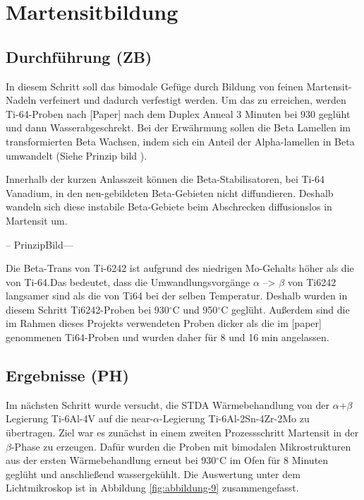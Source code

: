 \chapter{Martensitbildung}

\section{Durchführung (ZB)}

In diesem Schritt soll das bimodale Gefüge durch Bildung von feinen Martensit-Nadeln verfeinert und dadurch verfestigt werden. Um das zu erreichen, werden Ti-64-Proben nach [Paper] nach dem Duplex Anneal 3 Minuten bei 930 geglüht und dann Wasserabgeschrekt. Bei der Erwährmung sollen die Beta Lamellen im transformierten Beta Wachsen, indem sich ein Anteil der Alpha-lamellen in Beta umwandelt (Siehe Prinzip bild ).

Innerhalb der kurzen Anlasszeit können die Beta-Stabilisatoren, bei Ti-64 Vanadium, in den neu-gebildeten Beta-Gebieten nicht diffundieren. Deshalb wandeln sich diese instabile Beta-Gebiete beim Abschrecken diffusionslos in Martensit um.



\vspace{1ex}

-- PrinzipBild---


Die Beta-Trans von Ti-6242 ist aufgrund des niedrigen Mo-Gehalts höher als die von Ti-64.Das bedeutet, dass die Umwandlungsvorgänge $\alpha$ --> $\beta$ von Ti6242 langsamer sind als die von Ti64 bei der selben Temperatur. Deshalb wurden in diesem Schritt Ti6242-Proben bei 930$^\circ$C und 950$^\circ$C  geglüht. Außerdem sind die im Rahmen dieses Projekts verwendeten Proben dicker als die im [paper] genommenen Ti64-Proben und wurden daher für 8 und 16 min angelassen.



\section{Ergebnisse (PH)}

Im nächsten Schritt wurde versucht, die STDA Wärmebehandlung von der $\alpha$+$\beta$ Legierung Ti-6Al-4V auf die near-$\alpha$-Legierung Ti-6Al-2Sn-4Zr-2Mo zu übertragen. Ziel war es zunächst in einem zweiten Prozessschritt Martensit in der $\beta$-Phase zu erzeugen. Dafür wurden die Proben mit bimodalen Mikrostrukturen aus der ersten Wärmebehandlung erneut bei 930$^\circ$C im Ofen für 8 Minuten geglüht und anschließend wassergekühlt. Die Auswertung unter dem Lichtmikroskop ist in Abbildung \ref{fig:abbildung-9} zusammengefasst.


